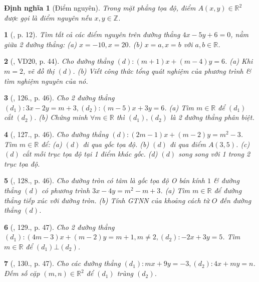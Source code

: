 \documentclass{article}
\newtheorem{baitoan}{}
\newtheorem{dinhnghia}{Định nghĩa}
\begin{document}
\begin{dinhnghia}[Điểm nguyên]
	Trong mặt phẳng tọa độ, điểm $A(x,y)\in\mathbb{R}^2$ được gọi là {\rm điểm nguyên} nếu $x,y\in\mathbb{Z}$.
\end{dinhnghia}

\begin{baitoan}[\cite{Binh_boi_duong_Toan_9_tap_2}, p. 12]
	Tìm tất cả các điểm nguyên trên đường thẳng $4x - 5y + 6 = 0$, nằm giữa 2 đường thẳng: (a) $x = -10,x = 20$. (b) $x = a,x = b$ với $a,b\in\mathbb{R}$.
\end{baitoan}

\begin{baitoan}[\cite{Tuyen_Toan_9_old}, VD20, p. 44]
	Cho đường thẳng $(d):(m + 1)x + (m - 4)y = 6$. (a) Khi $m = 2$, vẽ đồ thị $(d)$. (b)  Viết công thức tổng quát nghiệm của phương trình \& tìm nghiệm nguyên của nó.
\end{baitoan}

\begin{baitoan}[\cite{Tuyen_Toan_9_old}, 126., p. 46]
	Cho 2 đường thẳng $(d_1):3x - 2y = m + 3,(d_2):(m - 5)x + 3y = 6$. (a) Tìm $m\in\mathbb{R}$ để $(d_1)$ cắt $(d_2)$. (b) Chứng minh $\forall m\in\mathbb{R}$ thì $(d_1),(d_2)$ là 2 đường thẳng phân biệt.
\end{baitoan}

\begin{baitoan}[\cite{Tuyen_Toan_9_old}, 127., p. 46]
	Cho đường thẳng $(d):(2m - 1)x + (m - 2)y = m^2 - 3$. Tìm $m\in\mathbb{R}$ để: (a) $(d)$ đi qua gốc tọa độ. (b) $(d)$ đi qua điểm $A(3,5)$. (c) $(d)$ cắt mỗi trục tọa độ tại 1 điểm khác gốc. (d) $(d)$ song song với 1 trong 2 trục tọa độ.
\end{baitoan}

\begin{baitoan}[\cite{Tuyen_Toan_9_old}, 128., p. 46]
	Cho đường tròn có tâm là gốc tọa độ O bán kính $1$ \& đường thẳng $(d)$ có phương trình $3x - 4y = m^2 - m + 3$. (a) Tìm $m\in\mathbb{R}$ để đường thẳng tiếp xúc với đường tròn. (b) Tính {\rm GTNN} của khoảng cách từ $O$ đến đường thẳng $(d)$.
\end{baitoan}

\begin{baitoan}[\cite{Tuyen_Toan_9_old}, 129., p. 47]
	Cho 2 đường thẳng $(d_1):(4m - 3)x + (m - 2)y = m + 1,m\ne 2,(d_2):-2x + 3y = 5$. Tìm $m\in\mathbb{R}$ để $(d_1)\bot(d_2)$.
\end{baitoan}

\begin{baitoan}[\cite{Tuyen_Toan_9_old}, 130., p. 47]
	Cho các đường thẳng $(d_1):mx + 9y = -3,(d_2):4x + my = n$. Đếm số cặp $(m,n)\in\mathbb{R}^2$ để $(d_1)$ trùng $(d_2)$.
\end{baitoan}
\end{document}
